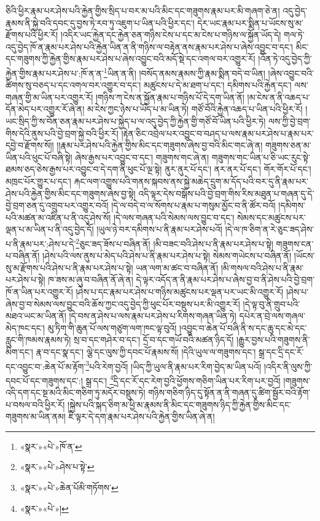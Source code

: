 ཅིའི་ཕྱིར་རྣམ་པར་ཤེས་པའི་རྐྱེན་གྱིས་སྲིད་པ་བར་མ་པའི་མིང་དང་གཟུགས་རྣམ་པར་མི་གཞག་ཅེ་ན། འདུ་བྱེད་རྣམས་ནི་སྐྱེ་བའི་དབང་དུ་བྱས་ཏེ་རབ་ཏུ་འཇུག་པ་ཡིན་པའི་ཕྱིར་དང་། དེར་ཡང་རྣམ་པར་སྨིན་པ་ཡོངས་སུ་མ་རྫོགས་པའི་ཕྱིར་རོ། །འདིར་ཡང་རྐྱེན་དང་རྐྱེན་ཅན་གཉིས་ངེས་པ་དང་མ་ངེས་པ་གཉིས་ལ་སྐྱོན་ཡོད་དེ། གལ་ཏེ་འདུ་བྱེད་ཁོ་ན་རྣམ་པར་ཤེས་པའི་རྐྱེན་ཡིན་ན་ནི་གཉིས་ལ་བརྟེན་ནས་རྣམ་པར་ཤེས་པ་ཞེས་འབྱུང་བ་དང་། མིང་དང་གཟུགས་ཀྱི་རྐྱེན་གྱིས་རྣམ་པར་ཤེས་པ་ཞེས་འབྱུང་བའི་མདོ་སྡེ་དང་འགལ་བར་འགྱུར་རོ། །འོན་ཏེ་འདུ་བྱེད་ཀྱི་རྐྱེན་གྱིས་རྣམ་པར་ཤེས་པ་:ཁོ་ན་ན་\footnote{«སྣར་»«པེ་»ཁོ་ན་}ཡིན་ན་ནི། །བསོད་ནམས་རྣམས་ཀྱི་རྣམ་སྨིན་བདེ་བ་ཡིན། །ཞེས་འབྱུང་བའི་ཚིགས་སུ་བཅད་པ་དང་འགལ་བར་འགྱུར་བ་དང་། མཚུངས་པ་དེ་མ་ཐག་པ་དང་། དམིགས་པའི་རྐྱེན་དང་། ལས་གཞན་གྱི་མ་ཡིན་པར་འགྱུར་རོ། །གཉིས་ཀ་ངེས་ན་སྐྱོན་རྣམ་པ་གཉིས་པོ་དེ་དག་ཡིན་ནོ། །མ་ངེས་ན་ནི་འཆད་པ་དོན་མེད་པར་འགྱུར་རོ་ཞེ་ན། མ་ངེས་ཀྱང་ཉེས་པ་ཡོད་པ་མ་ཡིན་ཏེ། གཙོ་བོའི་རྐྱེན་འཆད་པ་ཡིན་པའི་ཕྱིར་རོ། །ཡང་སྲིད་ཀྱི་ས་བོན་ཅན་རྣམ་པར་ཤེས་པ་སྐྱེད་པ་ལ་འདུ་བྱེད་ཀྱི་རྐྱེན་གྱི་གཙོ་བོ་ཡིན་པའི་ཕྱིར་ཏེ། ལས་ཀྱི་བྱེ་བྲག་གིས་དེའི་ནུས་པའི་བྱེ་བྲག་སྐྱེ་བའི་ཕྱིར་རོ། །རྟེན་ཅིང་འབྲེལ་པར་འབྱུང་བ་བཤད་པ་ལས་རྣམ་པར་ཤེས་པ་རྣམ་པར་དབྱེ་བ་རྫོགས་སོ།། །།རྣམ་པར་ཤེས་པའི་རྐྱེན་གྱིས་མིང་དང་གཟུགས་ཞེས་བྱ་བའི་མིང་གང་ཞེ་ན། གཟུགས་ཅན་མ་ཡིན་པའི་ཕུང་པོ་བཞི་སྟེ། ཞེས་རྒྱས་པར་འབྱུང་བ་དང་། གཟུགས་གང་ཞེ་ན། གཟུགས་གང་ཡིན་པ་ཅི་ཡང་རུང་སྟེ་ཐམས་ཅད་ཅེས་རྒྱས་པར་འབྱུང་བ་དེ་དག་ནི་ཕུང་པོ་ལྔ་སྟེ། ནུར་ནུར་པོ་དང་། ནར་ནར་པོ་དང་། གོར་གོར་པོ་དང་། མཁྲང་པོར་གྱུར་པ་དང་། རྐང་ལག་འགྱུས་པའི་གནས་སྐབས་ནས་སྐྱེ་མཆེད་དྲུག་མ་དོད་པའི་བར་དུ་ནི་རྣམ་པར་ཤེས་པའི་རྐྱེན་གྱིས་མིང་དང་གཟུགས་ཞེས་བྱ་སྟེ། འདི་ལྟར་དེས་བསྒོས་པའི་བྱེ་བྲག་གིས་རིས་མཐུན་པ་གཞན་དུ་དེ་བྱེ་བྲག་ཅན་དུ་འགྲུབ་པར་འགྱུར་བའོ། །དེ་ལ་བདེ་བ་ལ་སོགས་པ་རྣམ་པ་གསུམ་མྱོང་བ་ནི་ཚོར་བའོ། །དམིགས་པའི་མཚན་མ་འཛིན་པ་ནི་འདུ་ཤེས་སོ། །དེ་ལས་གཞན་པའི་སེམས་ལས་བྱུང་བ་དང་། སེམས་དང་མཚུངས་པར་ལྡན་པ་མ་ཡིན་པ་ནི་འདུ་བྱེད་དོ། །ཡུལ་ཉེ་བར་དམིགས་པ་ནི་རྣམ་པར་ཤེས་པའོ། །དེ་ལ་ཁ་ཅིག་ན་རེ་ཅུང་ཟད་ཤེས་པ་ནི་རྣམ་པར་:ཤེས་པ་དེ་\footnote{«སྣར་»«པེ་»ཤེས་པ་སྟེ་}ཅུང་ཟད་ཟོས་པ་བཞིན་ནོ། །མི་བཟང་བའི་ཤེས་པ་ནི་རྣམ་པར་ཤེས་པ་སྟེ། གཟུགས་ངན་པ་བཞིན་ནོ། །ཤེས་པའི་ལས་ནུས་པ་མེད་པའི་ཤེས་པ་ནི་རྣམ་པར་ཤེས་པ་སྟེ། སེམས་གཡེངས་པ་བཞིན་ནོ། །ཡོངས་སུ་མ་རྫོགས་པའི་ཤེས་པ་ནི་རྣམ་པར་ཤེས་པ་སྟེ། ཡན་ལག་མ་ཚང་བ་བཞིན་ནོ། །མི་གསལ་བའི་ཤེས་པ་ནི་རྣམ་པར་ཤེས་པ་སྟེ། ཁ་ཟས་མ་ཞུ་བ་བཞིན་ནོ་ཞེ་ན། དེ་ལྟར་འདོད་ན་ནི་རྣམ་པར་ཤེས་པ་ཞེས་བྱ་བ་ནི་ཤེས་པའི་བྱེ་བྲག་ཁོ་ན་ཡིན་པར་འགྱུར་རོ། །ཤེས་པ་དང་རྣམ་པར་ཤེས་པ་གཉིས་མཚུངས་པར་ལྡན་པར་ཡང་མི་འགྱུར་རོ། །ཤེས་པ་ཞེས་བྱ་བ་སེམས་ལས་བྱུང་བའི་ཆོས་ཀྱང་འདུ་བྱེད་ཀྱི་ཕུང་པོར་བསྡུས་པར་མི་འགྱུར་རོ། །དེ་ལྟ་བུ་ནི་གྲུབ་པའི་མཐའ་ཡང་མ་ཡིན་ནོ། །དེ་བས་ན་ཤེས་པ་ལས་རྣམ་པར་ཤེས་པ་རིགས་གཞན་ཡིན་ཏེ། དཔེར་ན་བྲེ་ལས་གཞལ་མེད་ཁང་དང་། མུ་ཏིག་གི་ཆུན་པོ་ལས་གཙུག་ལག་ཁང་ལྟ་བུའོ། །འབྱུང་བ་ཆེན་པོ་བཞི་ནི་ས་དང་ཆུ་དང་མེ་དང་རླུང་གི་ཁམས་རྣམས་ཏེ། སྲ་བ་དང་གཤེར་བ་དང་། དྲོ་བ་དང་གཡོ་བའི་མཚན་ཉིད་དོ། །རྒྱུར་བྱས་པའི་གཟུགས་ནི་མིག་དང་། རྣ་བ་དང་སྣ་དང་། ལྕེ་དང་ལུས་ཀྱི་དབང་པོ་རྣམས་སོ། །དེའི་ཡུལ་ལ་གཟུགས་དང་། སྒྲ་དང་དྲི་དང་རོ་དང་འབྱུང་བ་:ཆེན་པོ་མ་རྟོག་\footnote{«སྣར་»«པེ་»ཆེན་པོམི་གཏོགས་}པའི་རེག་བྱའོ། །ཡིད་ཀྱི་ཡུལ་ནི་རྣམ་པར་རིག་བྱེད་མ་ཡིན་པའོ། །འདིར་ནི་ལུས་ཀྱི་དབང་པོ་དང་གཟུགས་དང་:། སྒྲ་དང་། \footnote{«སྣར་»«པེ་»།  }དྲི་དང་རོ་དང་རེག་བྱའི་ཕྱོགས་གཅིག་ཡིན་པར་རིག་པར་བྱའོ། །གཟུགས་འདི་དག་དང་སྔ་མའི་མིང་གཅིག་ཏུ་མདོར་བསྡུས་ཏེ། གཉིས་གཅིག་ཉིད་དུ་སྟོན་ན་ནི་གཞན་དུ་ཚིག་སྦྱོར་བའི་རྟོག་པ་བསལ་བའི་ཕྱིར་རོ། །སྐྱེས་པའི་སྐད་ཅིག་མ་ཕྱི་མ་རྣམས་ནི་མིང་དང་གཟུགས་ཉིད་ཀྱི་རྐྱེན་གྱིས་མིང་དང་གཟུགས་མ་ཡིན་ནམ། ཇི་ལྟར་དེ་དག་རྣམ་པར་ཤེས་པའི་རྐྱེན་གྱིས་ཡིན་ཞེ་ན། 